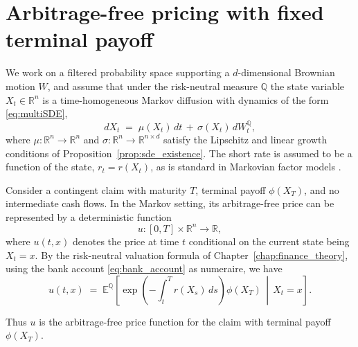 
\section{Arbitrage-free pricing with fixed terminal payoff}
\label{sec:pricing_pde}

We work on a filtered probability space supporting a $d$-dimensional Brownian motion $W$, and assume that under the risk-neutral measure $\mathbb{Q}$ the state variable $X_t \in \mathbb{R}^n$ is a time-homogeneous Markov diffusion with dynamics of the form \eqref{eq:multiSDE},
\begin{equation}
    dX_t \;=\; \mu(X_t)\,dt \,+\, \sigma(X_t)\,dW_t^{\mathbb{Q}},
\label{eq:state_SDE}
\end{equation}
where $\mu : \mathbb{R}^n \to \mathbb{R}^n$ and $\sigma : \mathbb{R}^n \to \mathbb{R}^{n\times d}$ satisfy the Lipschitz and linear growth conditions of Proposition~\ref{prop:sde_existence}. The short rate is assumed to be a function of the state, $r_t = r(X_t)$, as is standard in Markovian factor models \citep[Ch.~22--24]{Bjork2020}.

Consider a contingent claim with maturity $T$, terminal payoff $\phi(X_T)$, and no intermediate cash flows. In the Markov setting, its arbitrage-free price can be represented by a deterministic function
\[
    u : [0,T]\times\mathbb{R}^n \to \mathbb{R},
\]
where $u(t,x)$ denotes the price at time $t$ conditional on the current state being $X_t = x$. By the risk-neutral valuation formula of Chapter~\ref{chap:finance_theory}, using the bank account \eqref{eq:bank_account} as numeraire, we have
\begin{equation}
    u(t,x)
    \;=\;
    \mathbb{E}^{\mathbb{Q}}\!\left[
        \exp\!\left(-\int_t^T r(X_s)\,ds\right)\phi(X_T)
        \,\middle|\, X_t = x
    \right].
\label{eq:fixed_payoff_price}
\end{equation}

Thus $u$ is the arbitrage-free price function for the claim with terminal payoff $\phi(X_T)$.

